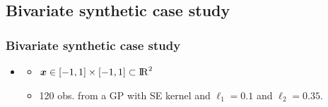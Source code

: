 \documentclass[8pt]{beamer} %
\begin{document}
\subsection*{Bivariate synthetic case study}
\begin{frame}\frametitle{Bivariate synthetic case study}

\vspace{-1mm}
\begin{itemize}\setlength\itemsep{1mm}
\item[]
\begin{itemize}\setlength\itemsep{1mm}
\item[] $\bm{x} \in [-1,1] \times [-1,1] \subset {\rm I\!R}^2$
\item[] 120 obs. from a GP with SE kernel and $\ell_1=0.1$ and $\ell_2=0.35$.
\end{itemize}
\end{itemize}


\end{frame}
\end{document}

